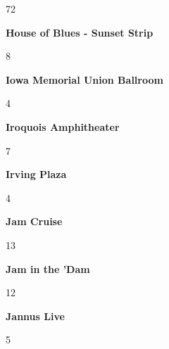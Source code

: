 \begin{center}72\end{center} 
\newline 
\begin{center}\textbf{House of Blues - Sunset Strip}\end{center}
\begin{center}8\end{center} 
\newline 
\begin{center}\textbf{Iowa Memorial Union Ballroom}\end{center}
\begin{center}4\end{center} 
\newline 
\begin{center}\textbf{Iroquois Amphitheater}\end{center}
\begin{center}7\end{center} 
\newline 
\begin{center}\textbf{Irving Plaza}\end{center}
\begin{center}4\end{center} 
\newline 
\begin{center}\textbf{Jam Cruise}\end{center}
\begin{center}13\end{center} 
\newline 
\begin{center}\textbf{Jam in the 'Dam}\end{center}
\begin{center}12\end{center} 
\newline 
\begin{center}\textbf{Jannus Live}\end{center}
\begin{center}5\end{center} 
\newline 
